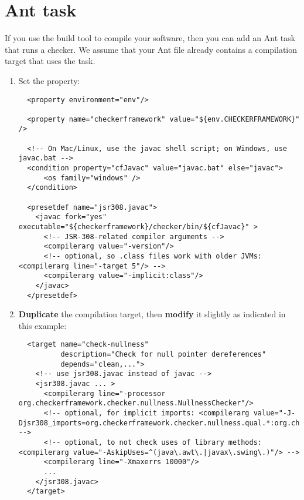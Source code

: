 \section{Ant task\label{ant-task}}

If you use the  build tool to compile
your software, then you can add an Ant task that runs a checker.  We assume
that your Ant file already contains a compilation target that uses the
 task.

\begin{enumerate}
\item
Set the  property:

\begin{smaller}
\begin{Verbatim}
  <property environment="env"/>

  <property name="checkerframework" value="${env.CHECKERFRAMEWORK}" />
  
  <!-- On Mac/Linux, use the javac shell script; on Windows, use javac.bat -->
  <condition property="cfJavac" value="javac.bat" else="javac">
      <os family="windows" />
  </condition>

  <presetdef name="jsr308.javac">
    <javac fork="yes" executable="${checkerframework}/checker/bin/${cfJavac}" >
      <!-- JSR-308-related compiler arguments -->
      <compilerarg value="-version"/>
      <!-- optional, so .class files work with older JVMs: <compilerarg line="-target 5"/> -->
      <compilerarg value="-implicit:class"/>
    </javac>
  </presetdef>
\end{Verbatim}
\end{smaller}

\item \textbf{Duplicate} the compilation target, then \textbf{modify} it slightly as
indicated in this example:

\begin{smaller}
\begin{Verbatim}
  <target name="check-nullness"
          description="Check for null pointer dereferences"
          depends="clean,...">
    <!-- use jsr308.javac instead of javac -->
    <jsr308.javac ... >
      <compilerarg line="-processor org.checkerframework.checker.nullness.NullnessChecker"/>
      <!-- optional, for implicit imports: <compilerarg value="-J-Djsr308_imports=org.checkerframework.checker.nullness.qual.*:org.checkerframework.dataflow.qual.*"/> -->
      <!-- optional, to not check uses of library methods: <compilerarg value="-AskipUses=^(java\.awt\.|javax\.swing\.)"/> -->
      <compilerarg line="-Xmaxerrs 10000"/>
      ...
    </jsr308.javac>
  </target>
\end{Verbatim}
\end{smaller}


\end{enumerate}
